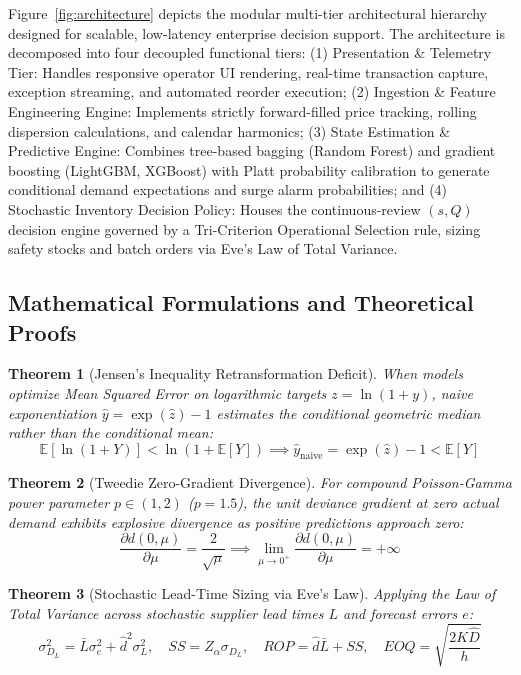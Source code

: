 \documentclass[11pt,a4paper]{article}
\newtheorem{theorem}{Theorem}
\begin{document}
Figure~\ref{fig:architecture} depicts the modular multi-tier architectural hierarchy designed for scalable, low-latency enterprise decision support. The architecture is decomposed into four decoupled functional tiers: (1) Presentation \& Telemetry Tier: Handles responsive operator UI rendering, real-time transaction capture, exception streaming, and automated reorder execution; (2) Ingestion \& Feature Engineering Engine: Implements strictly forward-filled price tracking, rolling dispersion calculations, and calendar harmonics; (3) State Estimation \& Predictive Engine: Combines tree-based bagging (Random Forest) and gradient boosting (LightGBM, XGBoost) with Platt probability calibration to generate conditional demand expectations and surge alarm probabilities; and (4) Stochastic Inventory Decision Policy: Houses the continuous-review $(s, Q)$ decision engine governed by a Tri-Criterion Operational Selection rule, sizing safety stocks and batch orders via Eve's Law of Total Variance.

\subsection{Mathematical Formulations and Theoretical Proofs}

\begin{theorem}[Jensen's Inequality Retransformation Deficit]
When models optimize Mean Squared Error on logarithmic targets $z = \ln(1+y)$, naive exponentiation $\hat{y} = \exp(\hat{z}) - 1$ estimates the conditional geometric median rather than the conditional mean:
\begin{equation}
\mathbb{E}[\ln(1 + Y)] < \ln(1 + \mathbb{E}[Y]) \implies \hat{y}_{\text{naive}} = \exp(\hat{z}) - 1 < \mathbb{E}[Y]
\end{equation}
\end{theorem}

\begin{theorem}[Tweedie Zero-Gradient Divergence]
For compound Poisson-Gamma power parameter $p \in (1, 2)$ ($p = 1.5$), the unit deviance gradient at zero actual demand exhibits explosive divergence as positive predictions approach zero:
\begin{equation}
\frac{\partial d(0, \mu)}{\partial \mu} = \frac{2}{\sqrt{\mu}} \implies \lim_{\mu \to 0^+} \frac{\partial d(0, \mu)}{\partial \mu} = +\infty
\end{equation}
\end{theorem}

\begin{theorem}[Stochastic Lead-Time Sizing via Eve's Law]
Applying the Law of Total Variance across stochastic supplier lead times $L$ and forecast errors $e$:
\begin{equation}
\sigma_{D_L}^2 = \bar{L}\sigma_e^2 + \hat{d}^2\sigma_L^2, \quad SS = Z_\alpha \sigma_{D_L}, \quad ROP = \hat{d}\bar{L} + SS, \quad EOQ = \sqrt{\frac{2 K \hat{D}}{h}}
\end{equation}
\end{theorem}
\end{document}
